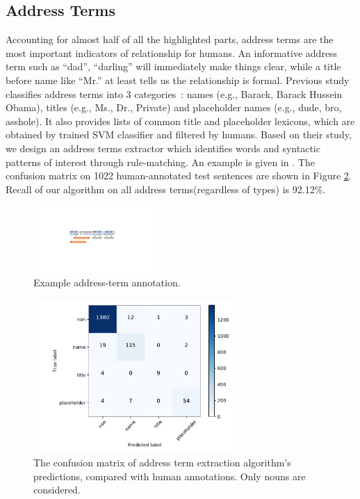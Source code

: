\subsection{Address Terms} 
\label{sec:address terms}
Accounting for almost half of all the highlighted parts, address terms are
the most important indicators of relationship for humans. 
An informative address term such as ``dad'', ``darling'' will 
immediately make things clear, while a title before name like 
``Mr.'' at least tells us the relationship is formal. 
Previous study classifies address terms into 
3 categories~\cite{address-term}:
 names (e.g., Barack, Barack Hussein Obama), titles (e.g., Ms., Dr., Private) 
and placeholder names (e.g., dude, bro, asshole). It also provides 
lists of common title and placeholder lexicons, 
which are obtained by trained SVM classifier and filtered by humans. 
Based on their study, we design an address terms extractor which 
identifies words and syntactic patterns of interest through rule-matching. 
An example is given in . 
The confusion matrix on 1022 human-annotated test sentences are shown 
in Figure \ref{fig:confusion}. Recall of our algorithm on all address terms(regardless of types) is 92.12\%.

\begin{figure}[t!]
	\centering
	\includegraphics[height=1in]{add-sample.pdf}
	\caption{Example address-term annotation.} 
	\label{fig:address}
\end{figure}

\begin{figure}[h!]
	\includegraphics[height=2.3in]{confusion.pdf}
	\caption{The confusion matrix of address term extraction algorithm's predictions, compared with human annotations. Only nouns are considered.}
	\label{fig:confusion}
\end{figure}

